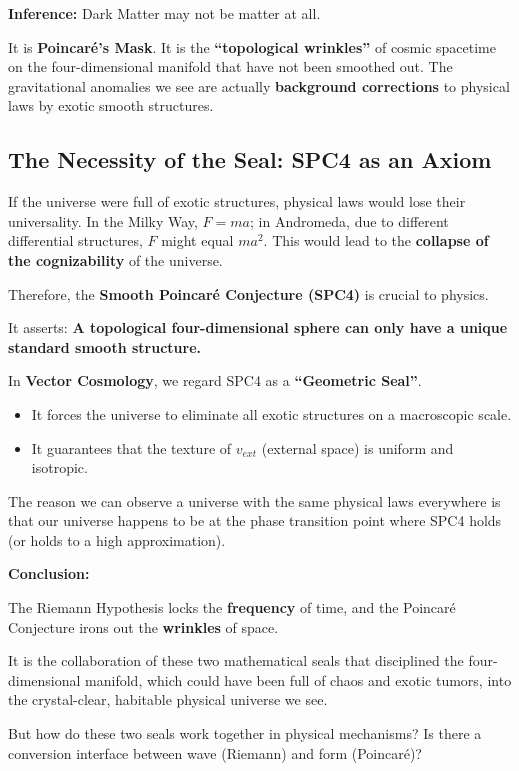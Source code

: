 \textbf{Inference:} Dark Matter may not be matter at all.

It is \textbf{Poincaré's Mask}. It is the \textbf{``topological wrinkles''} of cosmic spacetime on the four-dimensional manifold that have not been smoothed out. The gravitational anomalies we see are actually \textbf{background corrections} to physical laws by exotic smooth structures.

\subsection{The Necessity of the Seal: SPC4 as an Axiom}

If the universe were full of exotic structures, physical laws would lose their universality. In the Milky Way, $F=ma$; in Andromeda, due to different differential structures, $F$ might equal $ma^2$. This would lead to the \textbf{collapse of the cognizability} of the universe.

Therefore, the \textbf{Smooth Poincaré Conjecture (SPC4)} is crucial to physics.

It asserts: \textbf{A topological four-dimensional sphere can only have a unique standard smooth structure.}

In \textbf{Vector Cosmology}, we regard SPC4 as a \textbf{``Geometric Seal''}.

\begin{itemize}
\item It forces the universe to eliminate all exotic structures on a macroscopic scale.

\item It guarantees that the texture of $v_{ext}$ (external space) is uniform and isotropic.
\end{itemize}

The reason we can observe a universe with the same physical laws everywhere is that our universe happens to be at the phase transition point where SPC4 holds (or holds to a high approximation).

\textbf{Conclusion:}

The Riemann Hypothesis locks the \textbf{frequency} of time, and the Poincaré Conjecture irons out the \textbf{wrinkles} of space.

It is the collaboration of these two mathematical seals that disciplined the four-dimensional manifold, which could have been full of chaos and exotic tumors, into the crystal-clear, habitable physical universe we see.

But how do these two seals work together in physical mechanisms? Is there a conversion interface between wave (Riemann) and form (Poincaré)?

